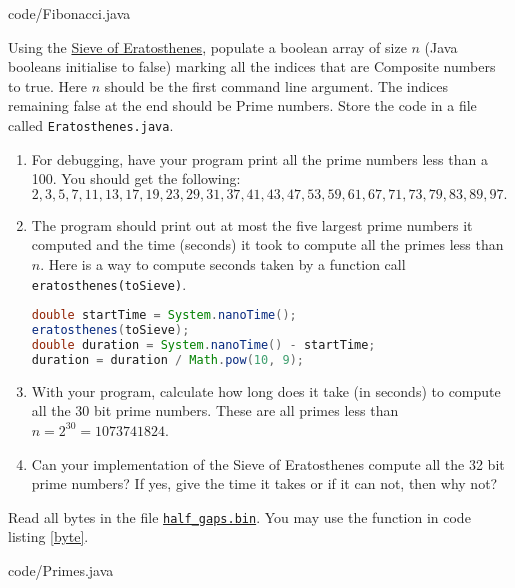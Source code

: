 \documentclass{homework}
\newcommand\callit[1]{Store the code in a file called \texttt{#1}.}
\begin{document}

{code/Fibonacci.java}

\question Using the
\href{https://en.wikipedia.org/wiki/Sieve_of_Eratosthenes}{Sieve
  of Eratosthenes}, populate a boolean array of size $n$ (Java
booleans initialise to false) marking all the indices that are
Composite numbers to true. Here $n$ should be the first command
line argument. The indices remaining false at the end should be
Prime numbers. \callit{Eratosthenes.java}

\begin{enumerate}
  \item For debugging, have your program print all the prime numbers less
        than a 100. You should get the following: $ 2, 3, 5, 7, 11, 13,
          17, 19, 23, 29, 31, 37, 41, 43, 47, 53, 59, 61, 67, 71, 73, 79,
          83, 89, 97. $
  \item The program should print out at most the five largest prime
        numbers it computed and the time (seconds) it took to compute all
        the primes less than $n$. Here is a way to compute seconds taken
        by a function call \texttt{eratosthenes(toSieve)}.

        \begin{lstlisting}[language=java]
double startTime = System.nanoTime();
eratosthenes(toSieve);
double duration = System.nanoTime() - startTime;
duration = duration / Math.pow(10, 9);
\end{lstlisting}

  \item With your program, calculate how long does it take (in seconds) to
        compute all the 30 bit prime numbers. These are all primes less
        than $n = 2^{30} = 1073741824$.

  \item Can your implementation of the Sieve of Eratosthenes compute all
        the 32 bit prime numbers? If yes, give the time it takes or if it
        can not, then why not?
\end{enumerate}

\question\label{32bitprimes} Read all bytes in the file
\href{https://tinyurl.com/24bvsnaf}{\texttt{half\_gaps.bin}}. You may
use the function in code listing \ref{byte}.


{code/Primes.java}
\end{document}
